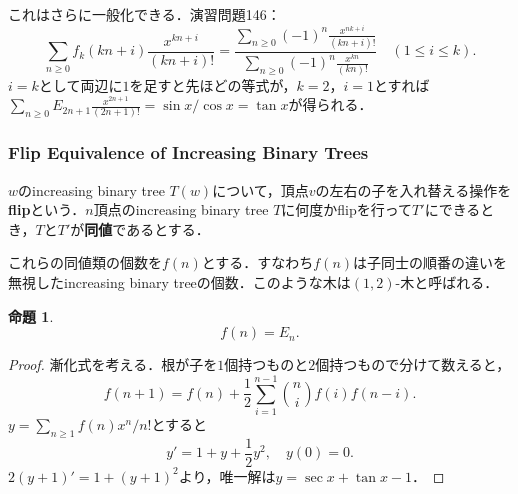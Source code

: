 \documentclass[xelatex,ja=standard,a4paper,14pt,everyparhook=compat]{bxjsarticle}
\theoremstyle{definition}
\newtheorem{proposition}[theorem]{命題}
\begin{document}
これはさらに一般化できる．演習問題146： \begin{equation*}
    \sum_{n \geq 0} f_k(kn+i) \frac{x^{kn+i}}{(kn+i)!} = \frac{\sum_{n \geq 0} (-1)^n \frac{x^{nk+i}}{(kn+i)!}}{\sum_{n \geq 0} (-1)^n \frac{x^{kn}}{(kn)!}} \quad (1 \leq i \leq k).
\end{equation*}
$i=k$として両辺に$1$を足すと先ほどの等式が，$k=2$，$i=1$とすれば$\sum_{n \geq 0} E_{2n+1} \frac{x^{2n+1}}{(2n+1)!} = \sin x / \cos x = \tan x$が得られる．

\subsubsection{Flip Equivalence of Increasing Binary Trees}

$w$のincreasing binary tree $T(w)$について，頂点$v$の左右の子を入れ替える操作を\textbf{flip}という．$n$頂点のincreasing binary tree $T$に何度かflipを行って$T'$にできるとき，$T$と$T'$が\textbf{同値}であるとする．


これらの同値類の個数を$f(n)$とする．すなわち$f(n)$は子同士の順番の違いを無視したincreasing binary treeの個数．このような木は$(1,2)$-木と呼ばれる．

\begin{proposition}
    \begin{equation*}
        f(n) = E_n.
    \end{equation*}
\end{proposition}
\begin{proof}
    漸化式を考える．根が子を$1$個持つものと$2$個持つもので分けて数えると， \begin{equation*}
        f(n+1) = f(n) + \frac{1}{2} \sum_{i=1}^{n-1} \binom{n}{i} f(i) f(n-i).
    \end{equation*}
    $y = \sum_{n \geq 1} f(n) x^n/n!$とすると \begin{equation*}
        y' = 1 + y + \frac{1}{2} y^2, \quad y(0) = 0.
    \end{equation*}
    $2 (y+1)' = 1 + (y+1)^2$より，唯一解は$y=\sec x + \tan x - 1$．
\end{proof}
\end{document}
